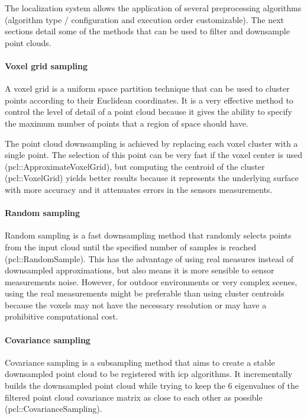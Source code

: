 The localization system allows the application of several preprocessing algorithms (algorithm type / configuration and execution order customizable). The next sections detail some of the methods that can be used to filter and downsample point clouds.


\paragraph{Voxel grid sampling}

A voxel grid is a uniform space partition technique that can be used to cluster points according to their Euclidean coordinates. It is a very effective method to control the level of detail of a point cloud because it gives the ability to specify the maximum number of points that a region of space should have.

The point cloud downsampling is achieved by replacing each voxel cluster with a single point. The selection of this point can be very fast if the voxel center is used (pcl::ApproximateVoxelGrid), but computing the centroid of the cluster (pcl::VoxelGrid) yields better results because it represents the underlying surface with more accuracy and it attenuates errors in the sensors measurements.


\paragraph{Random sampling}

Random sampling \cite{Vitter1984} is a fast downsampling method that randomly selects points from the input cloud until the specified number of samples is reached (pcl::RandomSample). This has the advantage of using real measures instead of downsampled approximations, but also means it is more sensible to sensor measurements noise. However, for outdoor environments or very complex scenes, using the real measurements might be preferable than using cluster centroids because the voxels may not have the necessary resolution or may have a prohibitive computational cost.


\paragraph{Covariance sampling}

Covariance sampling \cite{Gelfand} is a subsampling method that aims to create a stable downsampled point cloud to be registered with \gls{icp} algorithms. It incrementally builds the downsampled point cloud while trying to keep the 6 eigenvalues of the filtered point cloud covariance matrix as close to each other as possible (pcl::CovarianceSampling).

